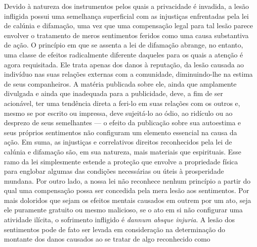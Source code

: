 Devido à natureza dos instrumentos pelos quais a privacidade é invadida,
a lesão infligida possui uma semelhança superficial com as injustiças
enfrentadas pela lei de calúnia e difamação, uma vez que uma compensação
legal para tal lesão parece envolver o tratamento de meros sentimentos
feridos como uma causa substantiva de ação. O princípio em que se
assenta a lei de difamação abrange, no entanto, uma classe de efeitos
radicalmente diferente daqueles para os quais a atenção é agora
requisitada. Ele trata apenas dos danos à reputação, da lesão causada ao
indivíduo nas suas relações externas com a comunidade, diminuindo-lhe na
estima de seus companheiros. A matéria publicada sobre ele, ainda que
amplamente divulgada e ainda que inadequada para a publicidade, deve, a
fim de ser acionável, ter uma tendência direta a feri-lo em suas
relações com os outros e, mesmo se por escrito ou impressa, deve
sujeitá-lo ao ódio, ao ridículo ou ao desprezo de seus semelhantes --- o
efeito da publicação sobre sua autoestima e seus próprios sentimentos
não configuram um elemento essencial na causa da ação. Em suma, as
injustiças e correlativos direitos reconhecidos pela lei de calúnia e
difamação são, em sua natureza, mais materiais que espirituais. Esse
ramo da lei simplesmente estende a proteção que envolve a propriedade
física para englobar algumas das condições necessárias ou úteis à
prosperidade mundana. Por outro lado, a nossa lei não reconhece nenhum
princípio a partir do qual uma compensação possa ser concedida pela mera
lesão aos sentimentos. Por mais doloridos que sejam os efeitos mentais
causados em outrem por um ato, seja ele puramente gratuito ou mesmo
malicioso, se o ato em si não configurar uma atividade ilícita, o
sofrimento infligido é \emph{dannum absque injuria}. A lesão dos
sentimentos pode de fato ser levada em consideração na determinação do
montante dos danos causados ao se tratar de algo reconhecido como
